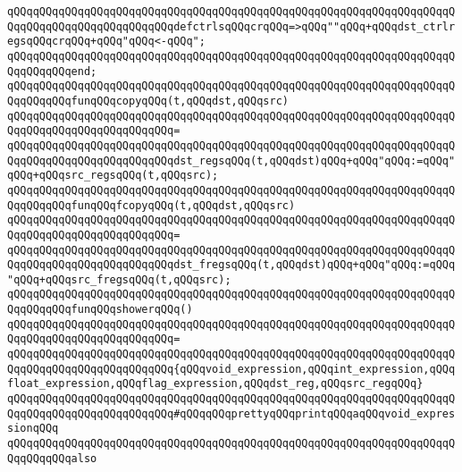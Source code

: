 \verb|qQQqqQQqqQQqqQQqqQQqqQQqqQQqqQQqqQQqqQQqqQQqqQQqqQQqqQQqqQQqqQQqqQQqqQQqqQQqqQQqqQQqqQQqqQQqqQQqdefctrlsqQQqcrqQQq=>qQQq""qQQq+qQQqdst_ctrlregsqQQqcrqQQq+qQQq"qQQq<-qQQq";|\newline
\verb|qQQqqQQqqQQqqQQqqQQqqQQqqQQqqQQqqQQqqQQqqQQqqQQqqQQqqQQqqQQqqQQqqQQqqQQqqQQqqQQqend;|\newline
\newline
\verb|qQQqqQQqqQQqqQQqqQQqqQQqqQQqqQQqqQQqqQQqqQQqqQQqqQQqqQQqqQQqqQQqqQQqqQQqqQQqqQQqfunqQQqcopyqQQq(t,qQQqdst,qQQqsrc)|\newline
\verb|qQQqqQQqqQQqqQQqqQQqqQQqqQQqqQQqqQQqqQQqqQQqqQQqqQQqqQQqqQQqqQQqqQQqqQQqqQQqqQQqqQQqqQQqqQQqqQQq=|\newline
\verb|qQQqqQQqqQQqqQQqqQQqqQQqqQQqqQQqqQQqqQQqqQQqqQQqqQQqqQQqqQQqqQQqqQQqqQQqqQQqqQQqqQQqqQQqqQQqqQQqdst_regsqQQq(t,qQQqdst)qQQq+qQQq"qQQq:=qQQq"qQQq+qQQqsrc_regsqQQq(t,qQQqsrc);|\newline
\newline
\verb|qQQqqQQqqQQqqQQqqQQqqQQqqQQqqQQqqQQqqQQqqQQqqQQqqQQqqQQqqQQqqQQqqQQqqQQqqQQqqQQqfunqQQqfcopyqQQq(t,qQQqdst,qQQqsrc)|\newline
\verb|qQQqqQQqqQQqqQQqqQQqqQQqqQQqqQQqqQQqqQQqqQQqqQQqqQQqqQQqqQQqqQQqqQQqqQQqqQQqqQQqqQQqqQQqqQQqqQQq=|\newline
\verb|qQQqqQQqqQQqqQQqqQQqqQQqqQQqqQQqqQQqqQQqqQQqqQQqqQQqqQQqqQQqqQQqqQQqqQQqqQQqqQQqqQQqqQQqqQQqqQQqdst_fregsqQQq(t,qQQqdst)qQQq+qQQq"qQQq:=qQQq"qQQq+qQQqsrc_fregsqQQq(t,qQQqsrc);|\newline
\newline
\verb|qQQqqQQqqQQqqQQqqQQqqQQqqQQqqQQqqQQqqQQqqQQqqQQqqQQqqQQqqQQqqQQqqQQqqQQqqQQqqQQqfunqQQqshowerqQQq()|\newline
\verb|qQQqqQQqqQQqqQQqqQQqqQQqqQQqqQQqqQQqqQQqqQQqqQQqqQQqqQQqqQQqqQQqqQQqqQQqqQQqqQQqqQQqqQQqqQQqqQQq=|\newline
\verb|qQQqqQQqqQQqqQQqqQQqqQQqqQQqqQQqqQQqqQQqqQQqqQQqqQQqqQQqqQQqqQQqqQQqqQQqqQQqqQQqqQQqqQQqqQQqqQQq{qQQqvoid_expression,qQQqint_expression,qQQqfloat_expression,qQQqflag_expression,qQQqdst_reg,qQQqsrc_regqQQq}|\newline
\newline
\verb|qQQqqQQqqQQqqQQqqQQqqQQqqQQqqQQqqQQqqQQqqQQqqQQqqQQqqQQqqQQqqQQqqQQqqQQqqQQqqQQqqQQqqQQqqQQqqQQq#qQQqqQQqprettyqQQqprintqQQqaqQQqvoid_expressionqQQq|\newline
\newline
\verb|qQQqqQQqqQQqqQQqqQQqqQQqqQQqqQQqqQQqqQQqqQQqqQQqqQQqqQQqqQQqqQQqqQQqqQQqqQQqqQQqalso|\newline
